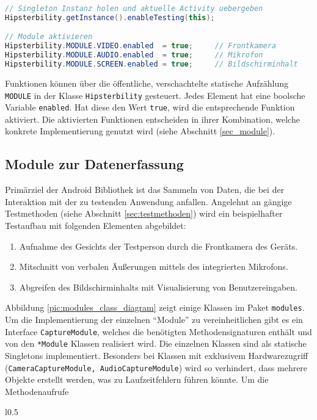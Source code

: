 \begin{lstlisting}[label=list_hipsterbility_client_init,language=Java, caption=Beispiel für Initialisierung der Android-Bibliothek]
// Singleton Instanz holen und aktuelle Activity uebergeben
Hipsterbility.getInstance().enableTesting(this);

// Module aktivieren
Hipsterbility.MODULE.VIDEO.enabled 	= true; 	// Frontkamera
Hipsterbility.MODULE.AUDIO.enabled 	= true;		// Mikrofon
Hipsterbility.MODULE.SCREEN.enabled = true;		// Bildschirminhalt
\end{lstlisting}

Funktionen können über die öffentliche, verschachtelte statische Aufzählung \texttt{MODULE} in der Klasse \texttt{Hipsterbility} gesteuert.
Jedes Element hat eine boolsche Variable \texttt{enabled}.
Hat diese den Wert \texttt{true}, wird die entsprechende Funktion aktiviert.
Die aktivierten Funktionen entscheiden in ihrer Kombination, welche konkrete Implementierung genutzt wird (siehe Abschnitt \ref{sec_module}).

\subsection{Module zur Datenerfassung \label{sec:module}}
Primärziel der Android Bibliothek ist das Sammeln von Daten, die bei der Interaktion mit der zu testenden Anwendung anfallen.
Angelehnt an gängige Testmethoden (siehe Abschnitt \ref{sec:testmethoden}) wird ein beispielhafter Testaufbau mit folgenden Elementen abgebildet:
\begin{enumerate}
	\item Aufnahme des Gesichts der Testperson durch die Frontkamera des Geräts.
	\item Mitschnitt von verbalen Äußerungen mittels des integrierten Mikrofons.
	\item Abgreifen des Bildschirminhalts mit Visualisierung von Benutzereingaben.
\end{enumerate}

Abbildung \ref{pic:modules_class_diagram} zeigt einige Klassen im Paket \texttt{modules}.
Um die Implementierung der einzelnen \enquote{Module} zu vereinheitlichen gibt es ein Interface \texttt{CaptureModule}, welches die benötigten Methodensignaturen enthält und von den \texttt{*Module} Klassen realisiert wird.
Die einzelnen Klassen sind als statische Singletons \cite[vgl.][21\psq]{designpattern} implementiert.
Besonders bei Klassen mit exklusivem Hardwarezugriff (\texttt{CameraCaptureModule, AudioCaptureModule}) wird so verhindert, dass mehrere Objekte erstellt werden, was zu Laufzeitfehlern führen könnte.
Um die Methodenaufrufe 
\begin{wrapfigure}[20]{l}{0.5\textwidth}
\caption{Klassendiagramm des Pakets \mbox{\texttt{modules}}.}
\label{pic:modules_class_diagram}
\end{wrapfigure}


